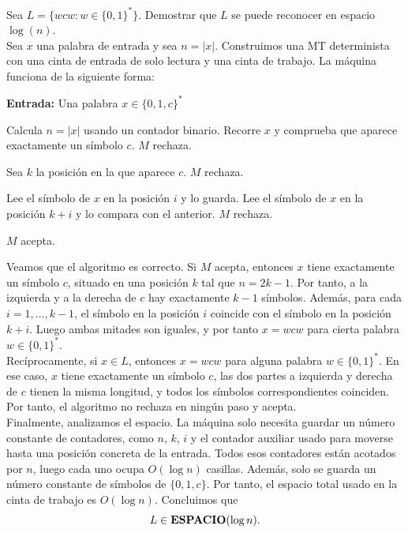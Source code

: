 \begin{ejercicio}
    Sea $L = \{wcw : w \in \{0,1\}^*\}.$ Demostrar que $L$ se puede reconocer en espacio $\log(n)$. \\

    Sea $x$ una palabra de entrada y sea $n = |x|$. Construimos una MT determinista con una cinta de entrada de solo lectura y una cinta de trabajo.
    La máquina funciona de la siguiente forma:

    \begin{algorithm}
        \caption{MT $M$}
        \label{algorithm:wcw-log}
        \begin{algorithmic}
            \State \textbf{Entrada:} Una palabra $x \in \{0,1,c\}^{*}$

            \State Calcula $n = |x|$ usando un contador binario.
            \State Recorre $x$ y comprueba que aparece exactamente un símbolo $c$.
                \State $M$ rechaza.
            \EndIf

            \State Sea $k$ la posición en la que aparece $c$.
                \State $M$ rechaza.
            \EndIf

                \State Lee el símbolo de $x$ en la posición $i$ y lo guarda.
                \State Lee el símbolo de $x$ en la posición $k+i$ y lo compara con el anterior.
                    \State $M$ rechaza.
                \EndIf
            \EndFor

            \State $M$ acepta.
        \end{algorithmic}
    \end{algorithm}

    Veamos que el algoritmo es correcto. Si $M$ acepta, entonces $x$ tiene exactamente un símbolo $c$, situado en una posición $k$ tal que $n = 2k-1$. 
    Por tanto, a la izquierda y a la derecha de $c$ hay exactamente $k-1$ símbolos. Además, para cada $i = 1,\dots,k-1$, el símbolo en la posición $i$ 
    coincide con el símbolo en la posición $k+i$. Luego ambas mitades son iguales, y por tanto $x = wcw$ para cierta palabra $w \in \{0,1\}^{*}$. \\

    Recíprocamente, si $x \in L$, entonces $x = wcw$ para alguna palabra $w \in \{0,1\}^{*}$. En ese caso, $x$ tiene exactamente un símbolo $c$, 
    las dos partes a izquierda y derecha de $c$ tienen la misma longitud, y todos los símbolos correspondientes coinciden. Por tanto, el algoritmo no rechaza en 
    ningún paso y acepta. \\

    Finalmente, analizamos el espacio. La máquina solo necesita guardar un número constante de contadores, como $n$, $k$, $i$ y el contador auxiliar usado para 
    moverse hasta una posición concreta de la entrada. Todos esos contadores están acotados por $n$, luego cada uno ocupa $O(\log n)$ casillas. Además, solo se guarda 
    un número constante de símbolos de $\{0,1,c\}$. Por tanto, el espacio total usado en la cinta de trabajo es $O(\log n)$. Concluimos que
    $$L \in \textbf{ESPACIO}(\log n).$$
\end{ejercicio}
